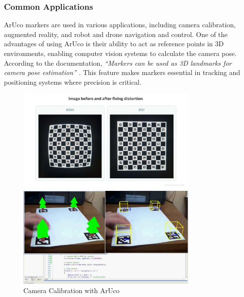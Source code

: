     \subsubsection{Common Applications}

    ArUco markers are used in various applications, including camera calibration, augmented reality, and robot and drone navigation and control. One of the advantages of using ArUco is their ability to act as reference points in 3D environments, enabling computer vision systems to calculate the camera pose. According to the documentation, \textit{“Markers can be used as 3D landmarks for camera pose estimation”} \cite{aruco_docs_pdf}. This feature makes markers essential in tracking and positioning systems where precision is critical.

    \begin{figure}
        \centering
        \begin{minipage}{0.3\textwidth}
            \centering
            \includegraphics[width=0.8\textwidth]{pictures/calibration_aruco.png}
            \caption{Camera Calibration with ArUco}
            \label{fig:imagen1}
        \end{minipage}
        \hfill
        \begin{minipage}{0.3\textwidth}
            \centering
            \includegraphics[width=0.8\textwidth]{pictures/augmented_reality.jpg}

\end{minipage}
\end{figure}
